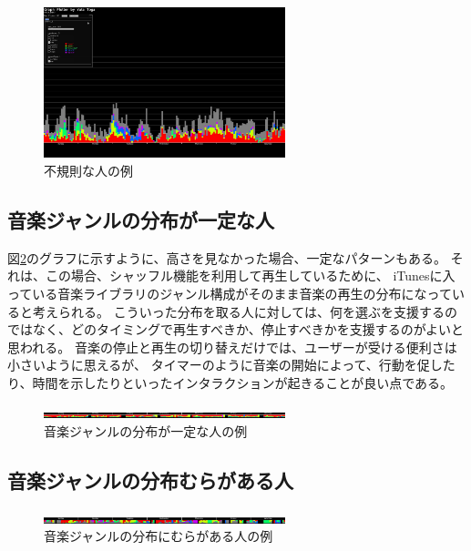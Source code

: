 \documentclass[11pt, twocolumn]{jsarticle}
\begin{document}
\begin{figure}[h]
\begin{center}
\includegraphics[width=7cm]{sample_irregular.jpg}
\caption{不規則な人の例}
\label{sample_irregular}
\end{center}
\end{figure}

\subsection{音楽ジャンルの分布が一定な人}
図\ref{genreMap_regular}のグラフに示すように、高さを見なかった場合、一定なパターンもある。
それは、この場合、シャッフル機能を利用して再生しているために、
iTunesに入っている音楽ライブラリのジャンル構成がそのまま音楽の再生の分布になっていると考えられる。
こういった分布を取る人に対しては、何を選ぶを支援するのではなく、どのタイミングで再生すべきか、停止すべきかを支援するのがよいと思われる。
音楽の停止と再生の切り替えだけでは、ユーザーが受ける便利さは小さいように思えるが、
タイマーのように音楽の開始によって、行動を促したり、時間を示したりといったインタラクションが起きることが良い点である。

\begin{figure}[h]
\begin{center}
\includegraphics[width=7cm]{genreMap_regular.jpg}
\caption{音楽ジャンルの分布が一定な人の例}
\label{genreMap_regular}
\end{center}
\end{figure}

\subsection{音楽ジャンルの分布むらがある人}
\begin{figure}[h]
\begin{center}
\includegraphics[width=7cm]{genreMap_irregular.jpg}
\caption{音楽ジャンルの分布にむらがある人の例}
\label{genreMap_irregular}
\end{center}
\end{figure}
\end{document}

